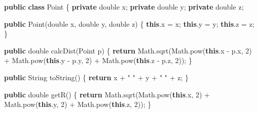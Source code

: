 \documentclass[
  12pt,
  a4paper,
]{article}
\newenvironment{Shaded}{}{}
\newcommand{\BuiltInTok}[1]{#1}
\newcommand{\ControlFlowTok}[1]{\textcolor[rgb]{0.00,0.44,0.13}{\textbf{#1}}}
\newcommand{\DataTypeTok}[1]{\textcolor[rgb]{0.56,0.13,0.00}{#1}}
\newcommand{\DecValTok}[1]{\textcolor[rgb]{0.25,0.63,0.44}{#1}}
\newcommand{\FunctionTok}[1]{\textcolor[rgb]{0.02,0.16,0.49}{#1}}
\newcommand{\KeywordTok}[1]{\textcolor[rgb]{0.00,0.44,0.13}{\textbf{#1}}}
\newcommand{\NormalTok}[1]{#1}
\newcommand{\OperatorTok}[1]{\textcolor[rgb]{0.40,0.40,0.40}{#1}}
\newcommand{\StringTok}[1]{\textcolor[rgb]{0.25,0.44,0.63}{#1}}
\begin{document}
\begin{Shaded}
\begin{Highlighting}[]
\KeywordTok{public} \KeywordTok{class} \BuiltInTok{Point} \OperatorTok{\{}
    \KeywordTok{private} \DataTypeTok{double}\NormalTok{ x}\OperatorTok{;}
    \KeywordTok{private} \DataTypeTok{double}\NormalTok{ y}\OperatorTok{;}
    \KeywordTok{private} \DataTypeTok{double}\NormalTok{ z}\OperatorTok{;}

    \KeywordTok{public} \BuiltInTok{Point}\OperatorTok{(}\DataTypeTok{double}\NormalTok{ x}\OperatorTok{,} \DataTypeTok{double}\NormalTok{ y}\OperatorTok{,} \DataTypeTok{double}\NormalTok{ z}\OperatorTok{)} \OperatorTok{\{}
        \KeywordTok{this}\OperatorTok{.}\FunctionTok{x} \OperatorTok{=}\NormalTok{ x}\OperatorTok{;}
        \KeywordTok{this}\OperatorTok{.}\FunctionTok{y} \OperatorTok{=}\NormalTok{ y}\OperatorTok{;}
        \KeywordTok{this}\OperatorTok{.}\FunctionTok{z} \OperatorTok{=}\NormalTok{ z}\OperatorTok{;}
    \OperatorTok{\}}

    \KeywordTok{public} \DataTypeTok{double} \FunctionTok{calcDist}\OperatorTok{(}\BuiltInTok{Point}\NormalTok{ p}\OperatorTok{)} \OperatorTok{\{}
        \ControlFlowTok{return} \BuiltInTok{Math}\OperatorTok{.}\FunctionTok{sqrt}\OperatorTok{(}\BuiltInTok{Math}\OperatorTok{.}\FunctionTok{pow}\OperatorTok{(}\KeywordTok{this}\OperatorTok{.}\FunctionTok{x} \OperatorTok{{-}}\NormalTok{ p}\OperatorTok{.}\FunctionTok{x}\OperatorTok{,} \DecValTok{2}\OperatorTok{)}
                         \OperatorTok{+} \BuiltInTok{Math}\OperatorTok{.}\FunctionTok{pow}\OperatorTok{(}\KeywordTok{this}\OperatorTok{.}\FunctionTok{y} \OperatorTok{{-}}\NormalTok{ p}\OperatorTok{.}\FunctionTok{y}\OperatorTok{,} \DecValTok{2}\OperatorTok{)}
                         \OperatorTok{+} \BuiltInTok{Math}\OperatorTok{.}\FunctionTok{pow}\OperatorTok{(}\KeywordTok{this}\OperatorTok{.}\FunctionTok{z} \OperatorTok{{-}}\NormalTok{ p}\OperatorTok{.}\FunctionTok{z}\OperatorTok{,} \DecValTok{2}\OperatorTok{));}
    \OperatorTok{\}}

    \KeywordTok{public} \BuiltInTok{String} \FunctionTok{toString}\OperatorTok{()} \OperatorTok{\{}
        \ControlFlowTok{return}\NormalTok{ x }\OperatorTok{+} \StringTok{" "} \OperatorTok{+}\NormalTok{ y }\OperatorTok{+} \StringTok{" "} \OperatorTok{+}\NormalTok{ z}\OperatorTok{;}
    \OperatorTok{\}}

    \KeywordTok{public} \DataTypeTok{double} \FunctionTok{getR}\OperatorTok{()} \OperatorTok{\{}
        \ControlFlowTok{return} \BuiltInTok{Math}\OperatorTok{.}\FunctionTok{sqrt}\OperatorTok{(}\BuiltInTok{Math}\OperatorTok{.}\FunctionTok{pow}\OperatorTok{(}\KeywordTok{this}\OperatorTok{.}\FunctionTok{x}\OperatorTok{,} \DecValTok{2}\OperatorTok{)}
                         \OperatorTok{+} \BuiltInTok{Math}\OperatorTok{.}\FunctionTok{pow}\OperatorTok{(}\KeywordTok{this}\OperatorTok{.}\FunctionTok{y}\OperatorTok{,} \DecValTok{2}\OperatorTok{)}
                         \OperatorTok{+} \BuiltInTok{Math}\OperatorTok{.}\FunctionTok{pow}\OperatorTok{(}\KeywordTok{this}\OperatorTok{.}\FunctionTok{z}\OperatorTok{,} \DecValTok{2}\OperatorTok{));}
    \OperatorTok{\}}


\end{Highlighting}
\end{Shaded}
\end{document}
